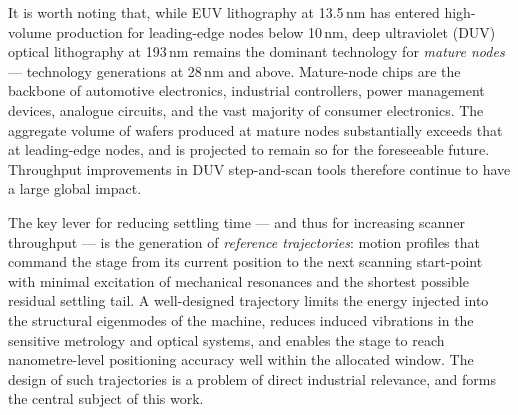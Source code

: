 \documentclass[11pt]{article}
\theoremstyle{definition}
\begin{document}
It is worth noting that, while EUV lithography at 13.5\,nm has entered high-volume production for leading-edge nodes below 10\,nm, deep ultraviolet (DUV) optical lithography at 193\,nm remains the dominant technology for \textit{mature nodes} — technology generations at 28\,nm and above. Mature-node chips are the backbone of automotive electronics, industrial controllers, power management devices, analogue circuits, and the vast majority of consumer electronics. The aggregate volume of wafers produced at mature nodes substantially exceeds that at leading-edge nodes, and is projected to remain so for the foreseeable future. Throughput improvements in DUV step-and-scan tools therefore continue to have a large global impact.

The key lever for reducing settling time — and thus for increasing scanner throughput — is the generation of \textit{reference trajectories}: motion profiles that command the stage from its current position to the next scanning start-point with minimal excitation of mechanical resonances and the shortest possible residual settling tail. A well-designed trajectory limits the energy injected into the structural eigenmodes of the machine, reduces induced vibrations in the sensitive metrology and optical systems, and enables the stage to reach nanometre-level positioning accuracy well within the allocated window. The design of such trajectories is a problem of direct industrial relevance, and forms the central subject of this work.
\end{document}
